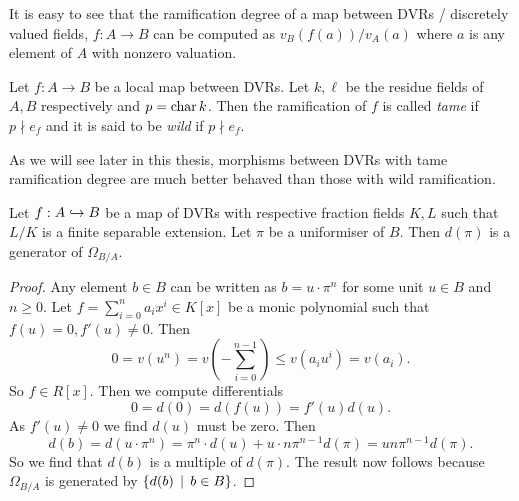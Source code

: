 It is easy to see that the ramification degree of a map between DVRs / discretely valued fields, $f: A \to B$ can be computed as $v_B(f(a)) / v_A(a)$ where $a$ is any element of $A$ with nonzero valuation. 
\medskip 

\begin{definition}
	Let $f: A \to B$ be a local map between DVRs. 
	Let $k, \ell$ be the residue fields of $A, B$ respectively and $p = \operatorname{char} k$. 
	Then the ramification of $f$ is called \emph{tame} if $p \nmid e_f$  and it is said to be \emph{wild} if $p \nmid e_f$. 
\end{definition}
As we will see later in this thesis, morphisms between DVRs with tame ramification degree are much better behaved than those with wild ramification. 

\begin{lemma}\label{lem:generator_canonical_bundle_DVR}
	Let $f: A \hookrightarrow B$ be a map of DVRs with respective fraction fields $K, L$ such that $L / K$ is a finite separable extension. 
	Let $\pi$ be a uniformiser of $B$. 
	Then $d(\pi)$ is a generator of $\Omega_{B / A}$. 
\end{lemma}
\begin{proof}
	Any element $b \in B$ can be written as $b = u \cdot \pi^{n} $ for some unit $u \in B$ and $n \ge 0$. 
	Let $f = \sum_{i = 0}^{n}  a_i x^{i} \in K[x]$ be a monic polynomial such that $f(u) = 0, f'(u) \ne 0$. 
	Then  \[
		0 = v(u^{n}) = v(- \sum_{i = 0}^{n-1}) \le v(a_i u^{i}) = v(a_i) 
	.\] 
	So $f \in R[x]$. 
	Then we compute differentials \[
		0 = d(0) = d(f(u)) = f'(u) d(u)
	.\] 
	As $f'(u) \ne 0$ we find $d(u)$ must be zero. 
	Then  \[
		d(b) = d(u\cdot \pi^{n}) = \pi^{n}\cdot d(u) + u\cdot  n \pi^{n-1}d(\pi) = un\pi^{n-1} d(\pi)
	.\] 
	So we find that $d(b)$ is a multiple of $d(\pi)$. 
	The result now follows because $\Omega_{B / A}$ is generated by $\{d(b) \st b \in B\} $.  
\end{proof}

